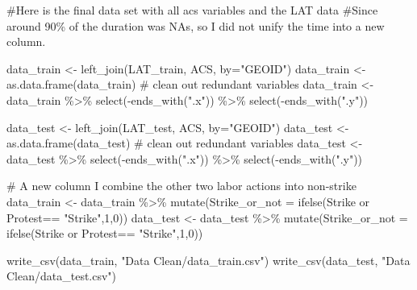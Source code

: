 \documentclass[
  letterpaper,
  DIV=11,
  numbers=noendperiod]{scrartcl}
\newenvironment{Shaded}{\begin{snugshade}}{\end{snugshade}}
\newcommand{\AttributeTok}[1]{\textcolor[rgb]{0.40,0.45,0.13}{#1}}
\newcommand{\CommentTok}[1]{\textcolor[rgb]{0.37,0.37,0.37}{#1}}
\newcommand{\DecValTok}[1]{\textcolor[rgb]{0.68,0.00,0.00}{#1}}
\newcommand{\FunctionTok}[1]{\textcolor[rgb]{0.28,0.35,0.67}{#1}}
\newcommand{\NormalTok}[1]{\textcolor[rgb]{0.00,0.23,0.31}{#1}}
\newcommand{\OtherTok}[1]{\textcolor[rgb]{0.00,0.23,0.31}{#1}}
\newcommand{\SpecialCharTok}[1]{\textcolor[rgb]{0.37,0.37,0.37}{#1}}
\newcommand{\StringTok}[1]{\textcolor[rgb]{0.13,0.47,0.30}{#1}}
\begin{document}
\begin{Shaded}
\begin{Highlighting}[]
\CommentTok{\#Here is the final data set with all acs variables and the LAT data}
\CommentTok{\#Since around 90\% of the duration was NAs, so I did not unify the time into a new column.}

\NormalTok{data\_train }\OtherTok{\textless{}{-}} \FunctionTok{left\_join}\NormalTok{(LAT\_train, ACS, }\AttributeTok{by=}\StringTok{"GEOID"}\NormalTok{)}
\NormalTok{data\_train }\OtherTok{\textless{}{-}} \FunctionTok{as.data.frame}\NormalTok{(data\_train)}
\CommentTok{\# clean out redundant variables}
\NormalTok{data\_train }\OtherTok{\textless{}{-}}\NormalTok{ data\_train  }\SpecialCharTok{\%\textgreater{}\%}
  \FunctionTok{select}\NormalTok{(}\SpecialCharTok{{-}}\FunctionTok{ends\_with}\NormalTok{(}\StringTok{".x"}\NormalTok{)) }\SpecialCharTok{\%\textgreater{}\%}
  \FunctionTok{select}\NormalTok{(}\SpecialCharTok{{-}}\FunctionTok{ends\_with}\NormalTok{(}\StringTok{".y"}\NormalTok{))}

\NormalTok{data\_test }\OtherTok{\textless{}{-}} \FunctionTok{left\_join}\NormalTok{(LAT\_test, ACS, }\AttributeTok{by=}\StringTok{"GEOID"}\NormalTok{)}
\NormalTok{data\_test }\OtherTok{\textless{}{-}} \FunctionTok{as.data.frame}\NormalTok{(data\_test)}
\CommentTok{\# clean out redundant variables}
\NormalTok{data\_test }\OtherTok{\textless{}{-}}\NormalTok{ data\_test  }\SpecialCharTok{\%\textgreater{}\%}
  \FunctionTok{select}\NormalTok{(}\SpecialCharTok{{-}}\FunctionTok{ends\_with}\NormalTok{(}\StringTok{".x"}\NormalTok{)) }\SpecialCharTok{\%\textgreater{}\%}
  \FunctionTok{select}\NormalTok{(}\SpecialCharTok{{-}}\FunctionTok{ends\_with}\NormalTok{(}\StringTok{".y"}\NormalTok{))}

\CommentTok{\# A new column I combine the other two labor actions into non{-}strike }
\NormalTok{data\_train }\OtherTok{\textless{}{-}}\NormalTok{ data\_train }\SpecialCharTok{\%\textgreater{}\%} 
  \FunctionTok{mutate}\NormalTok{(}\AttributeTok{Strike\_or\_not =} \FunctionTok{ifelse}\NormalTok{(}\StringTok{\textasciigrave{}}\AttributeTok{Strike or Protest}\StringTok{\textasciigrave{}}\SpecialCharTok{==} \StringTok{"Strike"}\NormalTok{,}\DecValTok{1}\NormalTok{,}\DecValTok{0}\NormalTok{))}
\NormalTok{data\_test }\OtherTok{\textless{}{-}}\NormalTok{ data\_test }\SpecialCharTok{\%\textgreater{}\%} 
  \FunctionTok{mutate}\NormalTok{(}\AttributeTok{Strike\_or\_not =} \FunctionTok{ifelse}\NormalTok{(}\StringTok{\textasciigrave{}}\AttributeTok{Strike or Protest}\StringTok{\textasciigrave{}}\SpecialCharTok{==} \StringTok{"Strike"}\NormalTok{,}\DecValTok{1}\NormalTok{,}\DecValTok{0}\NormalTok{))}

\FunctionTok{write\_csv}\NormalTok{(data\_train, }\StringTok{"Data Clean/data\_train.csv"}\NormalTok{)}
\FunctionTok{write\_csv}\NormalTok{(data\_test, }\StringTok{"Data Clean/data\_test.csv"}\NormalTok{)}
\end{Highlighting}
\end{Shaded}
\end{document}
